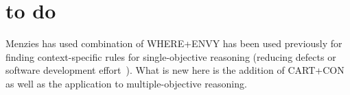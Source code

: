 \documentclass[runningheads]{llncs}
\begin{document}
\section{to do}

Menzies has used combination of WHERE+ENVY has been
used previously for finding context-specific rules
for single-objective reasoning (reducing defects or
software development effort~\cite{me12d}).  What is
new here is the addition of CART+CON as well as the
application to multiple-objective reasoning.

{\scriptsize



}
\end{document}
